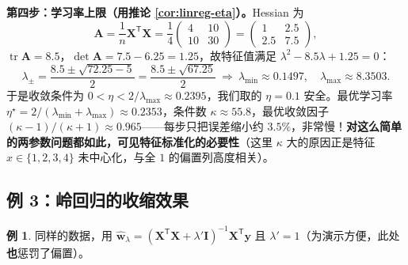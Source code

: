 \documentclass[UTF8,a4paper,11pt]{ctexart}
\theoremstyle{definition}
\newtheorem{example}[definition]{例}
\theoremstyle{plain}
\theoremstyle{remark}
\DeclareMathOperator{\tr}{tr}
\newcommand{\T}{^{\mathsf{T}}}
\begin{document}
\textbf{第四步：学习率上限（用推论 \ref{cor:linreg-eta}）。}Hessian 为
\[
  \bm{A}=\frac1n\bm{X}\T\bm{X}=\frac14\begin{pmatrix}4&10\\10&30\end{pmatrix}
  =\begin{pmatrix}1&2.5\\2.5&7.5\end{pmatrix},
\]
$\tr\bm{A}=8.5$，$\det\bm{A}=7.5-6.25=1.25$，故特征值满足 $\lambda^2-8.5\lambda+1.25=0$：
\[
  \lambda_{\pm}=\frac{8.5\pm\sqrt{72.25-5}}{2}=\frac{8.5\pm\sqrt{67.25}}{2}
  \ \Longrightarrow\ \lambda_{\min}\approx0.1497,\quad\lambda_{\max}\approx8.3503 .
\]
于是收敛条件为 $0<\eta<2/\lambda_{\max}\approx0.2395$，我们取的 $\eta=0.1$ 安全。最优学习率 $\eta^\star=2/(\lambda_{\min}+\lambda_{\max})\approx0.2353$，条件数 $\kappa\approx55.8$，最优收敛因子 $(\kappa-1)/(\kappa+1)\approx0.965$——每步只把误差缩小约 $3.5\%$，非常慢！\textbf{对这么简单的两参数问题都如此，可见特征标准化的必要性}（这里 $\kappa$ 大的原因正是特征 $x\in\{1,2,3,4\}$ 未中心化，与全 $1$ 的偏置列高度相关）。

\subsection{例 3：岭回归的收缩效果}

\begin{example}\label{ex:ridge}
同样的数据，用 $\hat{\bm{w}}_{\lambda}=(\bm{X}\T\bm{X}+\lambda'\bm{I})^{-1}\bm{X}\T\bm{y}$ 且 $\lambda'=1$（为演示方便，此处\textbf{也}惩罚了偏置）。
\end{example}
\end{document}
